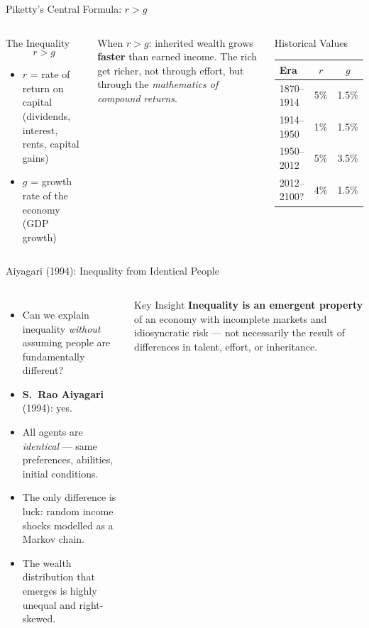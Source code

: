 \documentclass[aspectratio=169, 10pt]{beamer}
\begin{document}
\begin{frame}{Piketty's Central Formula: $r > g$}
\begin{columns}[T]
\begin{block}{The Inequality}
\[
  r > g
\]
\begin{itemize}
  \item $r$ = rate of return on capital (dividends, interest, rents,
        capital gains)
  \item $g$ = growth rate of the economy (GDP growth)
\end{itemize}
\end{block}
\vspace{0.5em}
When $r > g$: inherited wealth grows \textbf{faster} than earned income.
The rich get richer, not through effort, but through the \textit{mathematics
of compound returns}.
\begin{block}{Historical Values}
\begin{center}
\begin{tabular}{lcc}
\toprule
Era & $r$ & $g$ \\
\midrule
1870--1914 & 5\% & 1.5\% \\
1914--1950 & 1\% & 1.5\% \\
1950--2012 & 5\% & 3.5\% \\
2012--2100? & 4\% & 1.5\% \\
\bottomrule
\end{tabular}
\end{center}
\end{block}
\end{columns}
\end{frame}

\begin{frame}{Aiyagari (1994): Inequality from Identical People}
\begin{columns}[T]
\begin{itemize}
  \item Can we explain inequality \textit{without} assuming people
        are fundamentally different?
  \item \textbf{S.\ Rao Aiyagari} (1994): yes.
  \item All agents are \textit{identical} --- same preferences,
        abilities, initial conditions.
  \item The only difference is \alert{luck}: random income shocks
        modelled as a Markov chain.
  \item The wealth distribution that emerges is highly unequal
        and right-skewed.
\end{itemize}
\begin{block}{Key Insight}
\textbf{Inequality is an emergent property} of an economy with
incomplete markets and idiosyncratic risk --- not necessarily the
result of differences in talent, effort, or inheritance.
\end{block}
\end{columns}
\end{frame}
\end{document}

